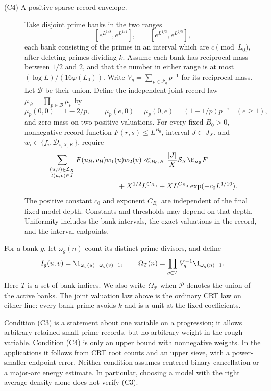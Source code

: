 \begin{description}
\item[\textup{(C4)} A positive sparse record envelope.]
Take disjoint prime banks in the two ranges
\[
 [e^{L^{1/8}},e^{L^{1/4}}],\qquad
 [e^{L^{1/3}},e^{L^{2/5}}],
\]
each bank consisting of the primes in an interval which are
\(c\pmod{L_0}\), after deleting primes dividing \(k\). Assume each
bank has reciprocal mass between \(1/2\) and \(2\), and that the
number in either range is at most \((\log L)/(16\varphi(L_0))\).
Write \(V_g=\sum_{p\in\mathcal P_g}p^{-1}\) for its reciprocal mass.
Let \(\mathcal B\) be their union. Define the independent joint
record law \(\mu_{\mathcal B}=\prod_{p\in\mathcal B}\mu_p\) by
\begin{equation}\label{eq:bank-law}
 \mu_p(0,0)=1-2/p,\qquad
 \mu_p(e,0)=\mu_p(0,e)=(1-1/p)p^{-e}\quad(e\ge1),
\end{equation}
and zero mass on two positive valuations.
For every fixed \(B_0>0\), nonnegative record function
\(F(r,s)\le L^{B_0}\), interval \(J\subset J_X\), and
\(w_i\in\{f_i,\mathcal D_{i,X,K}\}\), require
\begin{align}
 &\sum_{\substack{(u,v)\in\mathcal L_X\\t(u,v)\in J}}
     F(u_{\mathcal B},v_{\mathcal B})w_1(u)w_2(v)
       \ll_{B_0,K}\frac{|J|}{X}\mathcal S_X
                              \E_{\mu_{\mathcal B}}F\notag\\
 &\hspace{34mm}
       +X^{1/2}L^{C_{B_0}}
       +XL^{C_{B_0}}\exp(-c_0L^{1/10}).
                                                        \label{eq:comparison-envelope}
\end{align}
The positive constant \(c_0\) and exponent \(C_{B_0}\) are
independent of the final fixed model depth. Constants and thresholds
may depend on that depth. Uniformity includes the bank intervals,
the exact valuations in the record, and the interval endpoints.
\end{description}

For a bank \(g\), let \(\omega_g(n)\) count its distinct prime
divisors, and define
\[
 I_g(u,v)=\1_{\omega_g(u)=\omega_g(v)=1},\qquad
 \Omega_T(n)=\prod_{g\in T}V_g^{-1}\1_{\omega_g(n)=1}.
\]
Here \(T\) is a set of bank indices. We also write
\(\Omega_{\mathcal P}\) when \(\mathcal P\) denotes the union of
the active banks. The joint valuation law above
is the ordinary CRT law on either line: every bank prime avoids
\(k\) and is a unit at the fixed coefficients.

Condition (C3) is a statement about one variable on a progression;
it allows arbitrary retained small-prime records, but no arbitrary
weight in the rough variable. Condition (C4) is only an upper bound
with nonnegative weights. In the applications it follows from CRT
root counts and an upper sieve, with a power-smaller endpoint error.
Neither condition assumes centered binary cancellation or a major-arc
energy estimate. In particular, choosing a model with the right
average density alone does not verify (C3).

